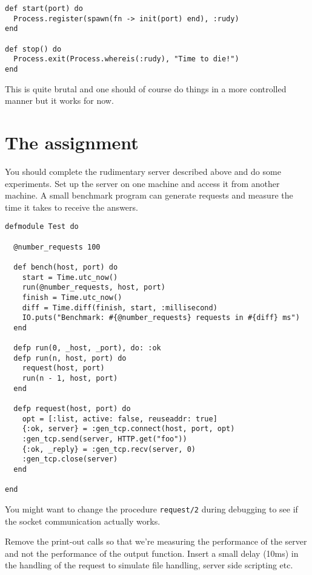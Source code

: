 \documentclass[a4paper,11pt]{article}
\begin{document}
\begin{verbatim}
def start(port) do
  Process.register(spawn(fn -> init(port) end), :rudy)
end

def stop() do
  Process.exit(Process.whereis(:rudy), "Time to die!")
end
\end{verbatim}

This is quite brutal and one should of course do things in a more
controlled manner but it works for now.



\section{The assignment}

You should complete the rudimentary server described above and do some
experiments. Set up the server on one machine and access it from
another machine. A small benchmark program can generate requests
and measure the time it takes to receive the answers.

\begin{verbatim}
defmodule Test do

  @number_requests 100

  def bench(host, port) do
    start = Time.utc_now()
    run(@number_requests, host, port)
    finish = Time.utc_now()
    diff = Time.diff(finish, start, :millisecond)
    IO.puts("Benchmark: #{@number_requests} requests in #{diff} ms")
  end

  defp run(0, _host, _port), do: :ok
  defp run(n, host, port) do
    request(host, port)
    run(n - 1, host, port)
  end

  defp request(host, port) do
    opt = [:list, active: false, reuseaddr: true]
    {:ok, server} = :gen_tcp.connect(host, port, opt)
    :gen_tcp.send(server, HTTP.get("foo"))
    {:ok, _reply} = :gen_tcp.recv(server, 0)
    :gen_tcp.close(server)
  end

end
\end{verbatim}

You might want to change the procedure {\tt request/2} during
debugging to see if the socket communication actually works.

Remove the print-out calls so that we're measuring the performance of
the server and not the performance of the output function. Insert a
small delay (10ms) in the handling of the request to simulate file
handling, server side scripting etc.
\end{document}
